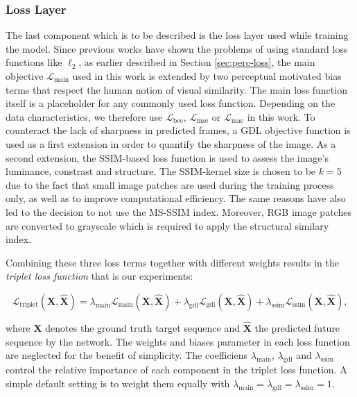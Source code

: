 \subsubsection{Loss Layer}

The last component which is to be described is the loss layer used while training the model. Since previous works have shown the problems of using standard loss functions like $\ell_2$, as earlier described in Section \ref{sec:perc-loss}, the main objective $\mathcal{L}_{\textrm{main}}$ used in this work is extended by two perceptual motivated bias terms that respect the human notion of visual similarity. The main loss function itself is a placeholder for any commonly used loss function. Depending on the data characteristics, we therefore use $\mathcal{L}_{\textrm{bce}}$, $\mathcal{L}_{\textrm{mse}}$ or $\mathcal{L}_{\textrm{mae}}$ in this work. To counteract the lack of sharpness in predicted frames, a GDL objective function is used as a first extension in order to quantify the sharpness of the image. As a second extension, the SSIM-based loss function is used to assess the image's luminance, constrast and structure. The SSIM-kernel size is chosen to be $k=5$ due to the fact that small image patches are used during the training process only, as well as to improve computational efficiency. The same reasons have also led to the decision to not use the MS-SSIM index. 
Moreover, RGB image patches are converted to grayscale which is required to apply the structural similary index.

Combining these three loss terms together with different weights results in the \textit{triplet loss function} that is our experiments:

\begin{equation} \label{eq:triplet}
\mathcal{L}_{\textrm{triplet}}(\textbf{X}, \hat{\textbf{X}}) = \lambda_{\textrm{main}} \mathcal{L}_{\textrm{main}}(\textbf{X}, \hat{\textbf{X}}) + \lambda_{\textrm{gdl}} \mathcal{L}_{\textrm{gdl}}(\textbf{X}, \hat{\textbf{X}}) + \lambda_{\textrm{ssim}} \mathcal{L}_{\textrm{ssim}}(\textbf{X}, \hat{\textbf{X}}) ,
\end{equation}

where $ \textbf{X} $ denotes the ground truth target sequence and $ \hat{\textbf{X}} $ the predicted future sequence by the network. The weights and biases parameter in each loss function are neglected for the benefit of simplicity. The coefficiens $\lambda_{\textrm{main}}$, $\lambda_{\textrm{gdl}}$ and $\lambda_{\textrm{ssim}}$ control the relative importance of each component in the triplet loss function. A simple default setting is to weight them equally with $\lambda_{\textrm{main}} = \lambda_{\textrm{gdl}} = \lambda_{\textrm{ssim}} = 1$.


